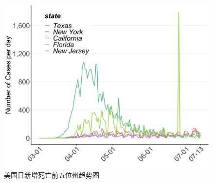 \documentclass[]{article}
\begin{document}
\begin{figure}[H]
\centering
{}
\caption{美国日新增死亡前五位州趋势图}
\includegraphics[]{./input/covid6.png}
\end{figure}
\end{document}
